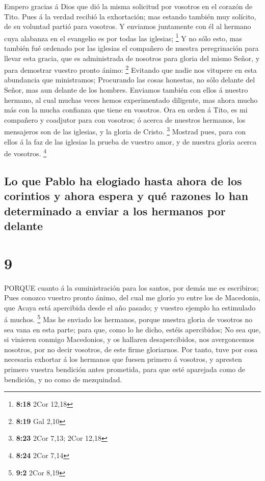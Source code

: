  Empero gracias á Dios que dió la misma solicitud por
vosotros en el corazón de Tito.  Pues á la verdad recibió
la exhortación; mas estando también muy solícito, de su voluntad partió
para vosotros.  Y enviamos juntamente con él al hermano
cuya alabanza en el evangelio es por todas las iglesias; \footnote{\textbf{8:18}
  2Cor 12,18}  Y no sólo esto, mas también fué ordenado por
las iglesias el compañero de nuestra peregrinación para llevar esta
gracia, que es administrada de nosotros para gloria del mismo Señor, y
para demostrar vuestro pronto ánimo: \footnote{\textbf{8:19} Gal 2,10}
 Evitando que nadie nos vitupere en esta abundancia que
ministramos;  Procurando las cosas honestas, no sólo
delante del Señor, mas aun delante de los hombres. 
Enviamos también con ellos á nuestro hermano, al cual muchas veces hemos
experimentado diligente, mas ahora mucho más con la mucha confianza que
tiene en vosotros.  Ora en orden á Tito, es mi compañero y
coadjutor para con vosotros; ó acerca de nuestros hermanos, los
mensajeros son de las iglesias, y la gloria de Cristo. \footnote{\textbf{8:23}
  2Cor 7,13; 2Cor 12,18}  Mostrad pues, para con ellos á la
faz de las iglesias la prueba de vuestro amor, y de nuestra gloria
acerca de vosotros. \footnote{\textbf{8:24} 2Cor 7,14}

\hypertarget{lo-que-pablo-ha-elogiado-hasta-ahora-de-los-corintios-y-ahora-espera-y-quuxe9-razones-lo-han-determinado-a-enviar-a-los-hermanos-por-delante}{%
\subsection{Lo que Pablo ha elogiado hasta ahora de los corintios y
ahora espera y qué razones lo han determinado a enviar a los hermanos
por
delante}\label{lo-que-pablo-ha-elogiado-hasta-ahora-de-los-corintios-y-ahora-espera-y-quuxe9-razones-lo-han-determinado-a-enviar-a-los-hermanos-por-delante}}

\hypertarget{section-8}{%
\section{9}\label{section-8}}

 PORQUE cuanto á la suministración para los santos, por
demás me es escribiros;  Pues conozco vuestro pronto ánimo,
del cual me glorío yo entre los de Macedonia, que Acaya está apercibida
desde el año pasado; y vuestro ejemplo ha estimulado á muchos.
\footnote{\textbf{9:2} 2Cor 8,19}  Mas he enviado los
hermanos, porque nuestra gloria de vosotros no sea vana en esta parte;
para que, como lo he dicho, estéis apercibidos;  No sea que,
si vinieren conmigo Macedonios, y os hallaren desapercibidos, nos
avergoncemos nosotros, por no decir vosotros, de este firme gloriarnos.
 Por tanto, tuve por cosa necesaria exhortar á los hermanos
que fuesen primero á vosotros, y apresten primero vuestra bendición
antes prometida, para que esté aparejada como de bendición, y no como de
mezquindad.

